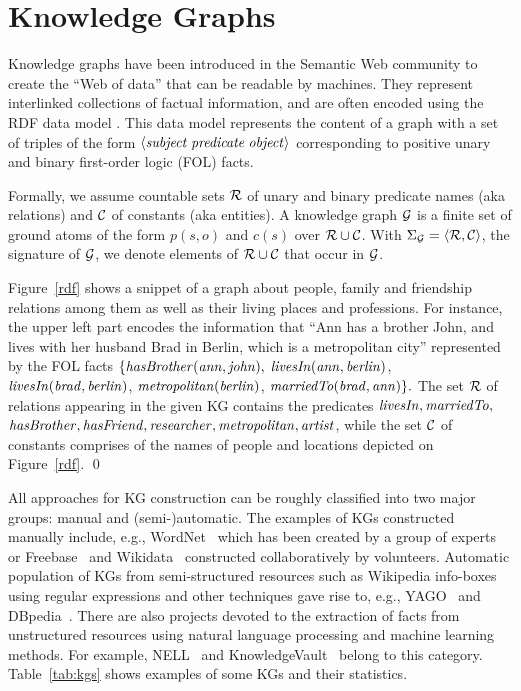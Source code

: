 \section{Knowledge Graphs}
\label{sec:kgs}

Knowledge graphs have been introduced in the Semantic Web community to create the ``Web of data'' that can be readable by machines. They represent interlinked collections of factual information, and are often encoded using the RDF data model \cite{rdf2004}. This data model represents the content of a graph with a set of triples of the form $\langle\mathit{subject\;predicate\;object}\rangle$ corresponding to positive unary and binary first-order logic (FOL) facts.  

Formally, we assume countable sets $\mathcal{R}$ of unary and binary predicate names (aka relations) and $\mathcal{C}$ of constants (aka entities). A knowledge graph $\mathcal{G}$ is a finite set of ground atoms of the form $p(s,o)$ and $c(s)$ over $\mathcal{R} \cup \mathcal{C}$. With $\Sigma_{\mathcal{G}}=\langle\mathcal{R},\mathcal{C}\rangle$, the signature of $\mathcal{G}$, we denote elements of $\mathcal{R} \cup \mathcal{C}$ that occur in $\mathcal{G}$.

\begin{example} Figure~\ref{rdf} shows a snippet of a graph about people, family and friendship %
relations among them as well as their living places and professions. For instance, the upper left part encodes the information that ``Ann has a brother John, and lives with her husband Brad in Berlin, which is a metropolitan city'' represented by the FOL facts $\{\mathit{hasBrother(ann, john),}$ $\mathit{ livesIn(ann, berlin)}$, \\$\mathit{livesIn(brad, berlin)}$, $\mathit{metropolitan(berlin)}$, $\mathit{marriedTo(brad, ann)}\}.$
The set $\mathcal{R}$ of relations appearing in the given KG contains the predicates $\mathit{livesIn,marriedTo,}$\\$\mathit{hasBrother,hasFriend,researcher,metropolitan,artist}$, while the set $\mathcal{C}$ of constants comprises of the names of people and locations depicted on Figure~\ref{rdf}. \qed
\end{example}



All approaches for KG construction can be roughly classified into two major groups: manual and (semi-)automatic. The examples of KGs constructed manually include, e.g., WordNet~\cite{wordnet} which has been created by a group of experts or Freebase~\cite{Freebase} and Wikidata~\cite{wikidata} constructed collaboratively by volunteers. 
Automatic population of KGs from semi-structured resources such as Wikipedia info-boxes using regular expressions and other techniques gave rise to, e.g., YAGO~\cite{yago} and DBpedia~\cite{dbpedia}. 
There are also projects 
devoted to the extraction of facts from unstructured resources using natural language processing and machine learning methods.  
For example, NELL~\cite{nell} and KnowledgeVault~\cite{KnowledgeVault} belong to this category. Table~\ref{tab:kgs} shows examples of some KGs and their statistics.


